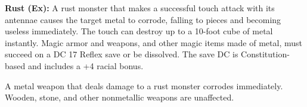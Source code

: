 \documentclass{article}
\begin{document}
\textbf{Rust (Ex):} A rust monster that makes a successful touch attack with its 
antennae causes the target metal to corrode, falling to pieces and becoming useless 
immediately. The touch can destroy up to a 10-foot cube of metal instantly. Magic 
armor and weapons, and other magic items made of metal, must succeed on a DC 17 
Reflex save or be dissolved. The save DC is Constitution-based and includes a +4 
racial bonus.

A metal weapon that deals damage to a rust monster corrodes immediately. Wooden, 
stone, and other nonmetallic weapons are unaffected.

\newpage
\end{document}

